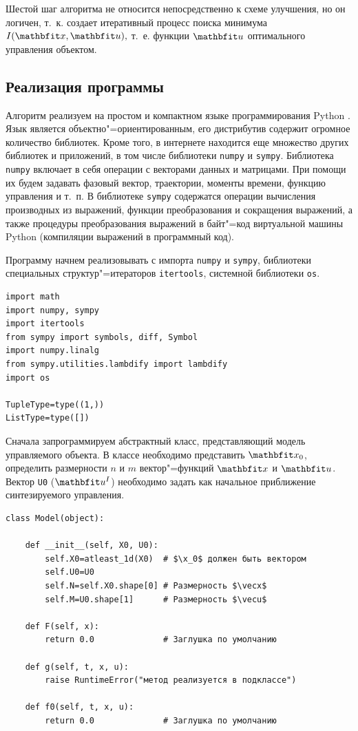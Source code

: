 \documentclass[a4paper,14pt, openany, twoside, draft]{extbook} %
\begin{document}
Шестой шаг алгоритма не относится непосредственно к схеме улучшения, но он логичен, т.~к. создает итеративный процесс поиска минимума $I(\x,\u),$ т.~е. функции $\vecu$ оптимального  управления объектом.

\subsection{Реализация программы}
\label{sec:improprog}

Алгоритм реализуем на простом и компактном языке программирования Python \cite{pythondl,pythondoc,pythonbook}.  Язык является объектно"=ориентированным, его дистрибутив содержит огромное количество библиотек.  Кроме того, в интернете находится еще множество других библиотек и приложений, в том числе библиотеки \texttt{numpy} и \texttt{sympy}.  Библиотека \texttt{numpy} включает в себя операции с векторами данных и матрицами.  При помощи их будем задавать фазовый вектор, траектории, моменты времени, функцию управления и т.~п.  В библиотеке \texttt{sympy} содержатся операции вычисления производных из выражений, функции преобразования и сокращения выражений, а также процедуры преобразования выражений в байт"=код виртуальной машины Python (компиляции выражений в программный код).

Программу начнем реализовывать с импорта \texttt{numpy} и \texttt{sympy}, библиотеки специальных структур"=итераторов \texttt{itertools}, системной библиотеки \texttt{os}.
\begin{verbatim}
import math
import numpy, sympy
import itertools
from sympy import symbols, diff, Symbol
import numpy.linalg
from sympy.utilities.lambdify import lambdify
import os

TupleType=type((1,))
ListType=type([])
\end{verbatim}

Сначала запрограммируем абстрактный класс, представляющий модель управляемого объекта.  В классе необходимо представить $\x_0$, определить размерности $n$ и $m$ вектор"=функций $\x$ и $\u$.  Вектор \texttt{U0} ($\u^{I}$) необходимо задать как начальное приближение синтезируемого управления.

\begin{verbatim}
class Model(object):

    def __init__(self, X0, U0):
        self.X0=atleast_1d(X0)  # $\x_0$ должен быть вектором
        self.U0=U0
        self.N=self.X0.shape[0] # Размерность $\vecx$
        self.M=U0.shape[1]      # Размерность $\vecu$

    def F(self, x):
        return 0.0              # Заглушка по умолчанию

    def g(self, t, x, u):
        raise RuntimeError("метод реализуется в подклассе")

    def f0(self, t, x, u):
        return 0.0              # Заглушка по умолчанию
\end{verbatim}
\end{document}
